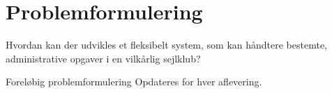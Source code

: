 \chapter{Problemformulering}\label{chap:problemformulering}

\cbstart

Hvordan kan der udvikles et fleksibelt system, som kan håndtere bestemte, administrative opgaver i en vilkårlig sejlklub?

\begin{anfxnote}{Foreløbig problemformulering}
  Opdateres for hver aflevering.
\end{anfxnote}

\cbend
